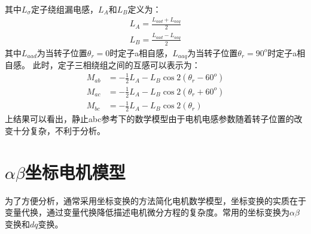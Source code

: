其中$L_{\sigma}$定子绕组漏电感，$L_{A}$和$L_{B}$定义为：
\begin{align}\label{eq:induc2}
L_{A}= \frac{L_{aad}+L_{aaq}}{2}\\
L_{B}= \frac{L_{aad}-L_{aaq}}{2} 
\end{align}
其中$L_{aad}$为当转子位置$\theta_{r}=0$时定子a相自感，$L_{aaq}$为当转子位置$\theta_{r}=90^{o}$时定子a相自感。
此时，定子三相绕组之间的互感可以表示为：
\begin{align}
M_{ab}&=-\frac{1}{2}L_{A}-L_{B}\cos2(\theta_{r}-60^{o})\label{eq：Mab}\\
M_{ac}&=-\frac{1}{2}L_{A}-L_{B}\cos2(\theta_{r}+60^{o})\label{eq:Mac}\\
M_{bc}&=-\frac{1}{2}L_{A}-L_{B}\cos2(\theta_{r})\label{eq:Mbc}
\end{align}
上结果可以看出，静止abc参考下的数学模型由于电机电感参数随着转子位置的改变十分复杂，不利于分析。
\section{$\alpha\beta$坐标电机模型}\label{sec:model}
为了方便分析，通常采用坐标变换的方法简化电机数学模型，坐标变换的实质在于变量代换，通过变量代换降低描述电机微分方程的复杂度\cite{reference_frame}。常用的坐标变换为$\alpha\beta$变换和$dq$变换。
